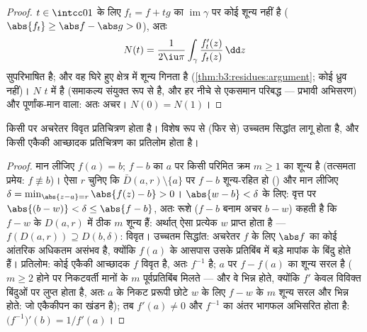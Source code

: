 \begin{proof}
$t \in \intcc01$ के लिए $f_t = f + tg$ का $\operatorname{im}\gamma$ पर कोई शून्य नहीं है ($\abs{f_t} \geq \abs f - \abs g >
0$), अतः
\[
N(t) = \frac1{2\iu\pi}\int_\gamma
\frac{f_t'(z)}{f_t(z)}\,\dd z
\]
सुपरिभाषित है; और वह घिरे हुए क्षेत्र में शून्य गिनता है (\cref{thm:b3:residues:argument};
कोई ध्रुव नहीं)। $N$ $t$ में  है (समाकल्य संयुक्त रूप से
 है, और हर नीचे से एकसमान परिबद्ध --- प्रभावी अभिसरण) और
पूर्णांक-मान वाला: अतः अचर। $N(0) = N(1)$।
\end{proof}

\begin{corollary}[विवृत प्रतिचित्रण प्रमेय]
\label{cor:b3:residues:openmapping}
किसी   पर अचरेतर  विवृत
प्रतिचित्रण होता है। विशेष रूप से (फिर से) उच्चतम सिद्धांत लागू
होता है, और किसी  एकैकी आच्छादक प्रतिचित्रण का प्रतिलोम
 होता है।
\end{corollary}

\begin{proof}
मान लीजिए $f(a) = b$; $f - b$ का $a$ पर किसी परिमित क्रम $m
\geq 1$ का शून्य
है (तत्समता प्रमेय: $f \not\equiv b$)। ऐसा $r$ चुनिए कि $\bar D(a, r)\setminus\{a\}$ पर $f - b$
शून्य-रहित हो () और मान लीजिए $\delta = \min_{\abs{z - a} =
r}\abs{f(z) - b} > 0$। $\abs{w - b} < \delta$ के लिए:
वृत्त पर $\abs{(b - w)} < \delta \leq \abs{f - b}$, अतः रूशे ($f - b$ बनाम अचर $b - w$) कहती है कि $f - w$
के $D(a, r)$ में ठीक $m$ शून्य हैं: अर्थात् ऐसा प्रत्येक $w$
प्राप्त होता है --- $f(D(a,r)) \supseteq D(b, \delta)$: विवृत। उच्चतम सिद्धांत: अचरेतर $f$
के लिए $\abs f$ का कोई आंतरिक अधिकतम असंभव है, क्योंकि $f(a)$ के आसपास
उसके प्रतिबिंब में बड़े मापांक के बिंदु होते हैं। प्रतिलोम: कोई
 एकैकी आच्छादक $f$ विवृत है, अतः $f^{-1}$  है;
$a$ पर $f - f(a)$ का शून्य सरल है ($m \geq 2$ होने पर निकटवर्ती मानों के
$m$ पूर्वप्रतिबिंब मिलते --- और वे भिन्न होते, क्योंकि $f'$
केवल विविक्त बिंदुओं पर लुप्त होता है, अतः $a$ के निकट प्ररूपी
छोटे $w$ के लिए $f - w$ के $m$ शून्य सरल और भिन्न होते: जो
एकैकीपन का खंडन है); तब $f'(a) \neq 0$ और $f^{-1}$ का अंतर भागफल अभिसरित होता
है: $\bigl(f^{-1}\bigr)'(b) =
1/f'(a)$।
\end{proof}

